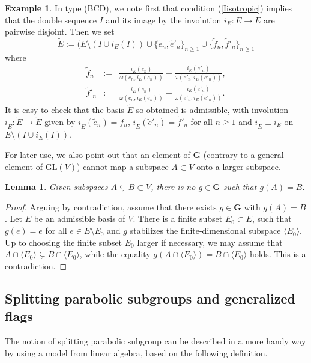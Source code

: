 \documentclass[12pt]{amsart}
\newcommand{\GL}{\mathrm{GL}}
\newcommand{\G}{\mathbf{G}}
\renewcommand{\span}[1]{\langle #1\rangle}
\numberwithin{equation}{section}
\newtheorem{lemma}[theorem]{Lemma}
\theoremstyle{definition}
\newtheorem{example}[theorem]{Example}
\begin{document}
\begin{example}
In type (BCD), we note first that condition (\ref{Iisotropic}) implies that the double sequence $I$ and its image by the involution $i_E:E\to E$ are pairwise disjoint. Then we set
\[
\tilde{E}:=(E\setminus (I\cup i_E(I))\cup\{\tilde{e}_n,\tilde{e}'_n\}_{n\geq 1}\cup\{\tilde{f}_n,\tilde{f}'_n\}_{n\geq 1}
\]
where
\begin{eqnarray*}
\tilde{f}_n & := & \frac{i_E(e_n)}{\omega(e_n,i_E(e_n))}+\frac{i_E(e'_n)}{\omega(e'_n,i_E(e'_n))},\\
\tilde{f}'_n & := & \frac{i_E(e_n)}{\omega(e_n,i_E(e_n))}-\frac{i_E(e'_n)}{\omega(e'_n,i_E(e'_n))}. \end{eqnarray*}
It is easy to check that the basis $\tilde{E}$ so-obtained is admissible, with involution $i_{\tilde{E}}:\tilde{E}\to\tilde{E}$ given by
$i_{\tilde{E}}(\tilde{e}_n)=\tilde{f}_n$,
$i_{\tilde{E}}(\tilde{e}'_n)=\tilde{f}'_n$ for all $n\geq 1$
and $i_{\tilde{E}}\equiv i_E$ on $E\setminus(I\cup i_E(I))$.
\end{example}

For later use, we also point out that an element of $\G$ (contrary to a general element of $\GL(V)$) cannot map a subspace $A\subset V$ onto a larger subspace.

\begin{lemma}
\label{L-new}
Given subspaces $A\subsetneq B\subset V$, there is no $g\in\G$ such that $g(A)=B$.
\end{lemma}

\begin{proof}
Arguing by contradiction, assume that there exists $g\in\G$ with $g(A)=B$.
Let $E$ be an admissible basis of $V$. There is a finite subset $E_0\subset E$, such that $g(e)=e$ for all $e\in E\setminus E_0$ and $g$ stabilizes the finite-dimensional subspace $\span{E_0}$. Up to choosing the finite subset $E_0$ larger if necessary, we may assume that $A\cap\span{E_0}\subsetneq B\cap\span{E_0}$, while the equality $g(A\cap\span{E_0})=B\cap\span{E_0}$ holds. This is a contradiction.
\end{proof}

\subsection{Splitting parabolic subgroups and generalized flags}

\label{section-2.2}

The notion of splitting parabolic subgroup can be described in a more handy way by using a model from linear algebra, based on the following definition.
\end{document}
